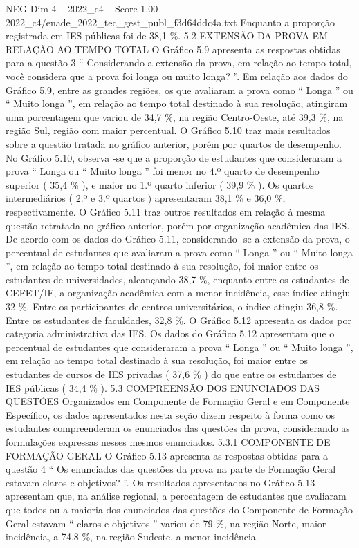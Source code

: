 \begin{textsample}{NEG Dim 4 – 2022\_c4 – Score 1.00 – 2022\_c4/enade\_2022\_tec\_gest\_publ\_f3d64ddc4a.txt}
Enquanto a proporção registrada em IES públicas foi de 38,1 \%. 5.2 EXTENSÃO DA PROVA EM RELAÇÃO AO TEMPO TOTAL O Gráfico 5.9 apresenta as respostas obtidas para a questão 3 “ Considerando a extensão da prova, em relação ao tempo total, você considera que a prova foi longa ou muito longa? ”.
Em relação aos dados do Gráfico 5.9, entre as grandes regiões, os que avaliaram a prova como “ Longa ” ou “ Muito longa ”, em relação ao tempo total destinado à sua resolução, atingiram uma porcentagem que variou de 34,7 \%, na região Centro-Oeste, até 39,3 \%, na região Sul, região com maior percentual.
O Gráfico 5.10 traz mais resultados sobre a questão tratada no gráfico anterior, porém por quartos de desempenho.
No Gráfico 5.10, observa -se que a proporção de estudantes que consideraram a prova “ Longa ou “ Muito longa ” foi menor no 4.º quarto de desempenho superior ( 35,4 \% ), e maior no 1.º quarto inferior ( 39,9 \% ).
Os quartos intermediários ( 2.º e 3.º quartos ) apresentaram 38,1 \% e 36,0 \%, respectivamente.
O Gráfico 5.11 traz outros resultados em relação à mesma questão retratada no gráfico anterior, porém por organização acadêmica das IES.
De acordo com os dados do Gráfico 5.11, considerando -se a extensão da prova, o percentual de estudantes que avaliaram a prova como “ Longa ” ou “ Muito longa ”, em relação ao tempo total destinado à sua resolução, foi maior entre os estudantes de universidades, alcançando 38,7 \%, enquanto entre os estudantes de CEFET/IF, a organização acadêmica com a menor incidência, esse índice atingiu 32 \%.
Entre os participantes de centros universitários, o índice atingiu 36,8 \%.
Entre os estudantes de faculdades, 32,8 \%.
O Gráfico 5.12 apresenta os dados por categoria administrativa das IES.
Os dados do Gráfico 5.12 apresentam que o percentual de estudantes que consideraram a prova “ Longa ” ou “ Muito longa ”, em relação ao tempo total destinado à sua resolução, foi maior entre os estudantes de cursos de IES privadas ( 37,6 \% ) do que entre os estudantes de IES públicas ( 34,4 \% ). 5.3 COMPREENSÃO DOS ENUNCIADOS DAS QUESTÕES Organizados em Componente de Formação Geral e em Componente Específico, os dados apresentados nesta seção dizem respeito à forma como os estudantes compreenderam os enunciados das questões da prova, considerando as formulações expressas nesses mesmos enunciados. 5.3.1 COMPONENTE DE FORMAÇÃO GERAL O Gráfico 5.13 apresenta as respostas obtidas para a questão 4 “ Os enunciados das questões da prova na parte de Formação Geral estavam claros e objetivos? ”.
Os resultados apresentados no Gráfico 5.13 apresentam que, na análise regional, a percentagem de estudantes que avaliaram que todos ou a maioria dos enunciados das questões do Componente de Formação Geral estavam “ claros e objetivos ” variou de 79 \%, na região Norte, maior incidência, a 74,8 \%, na região Sudeste, a menor incidência.

\end{textsample}

